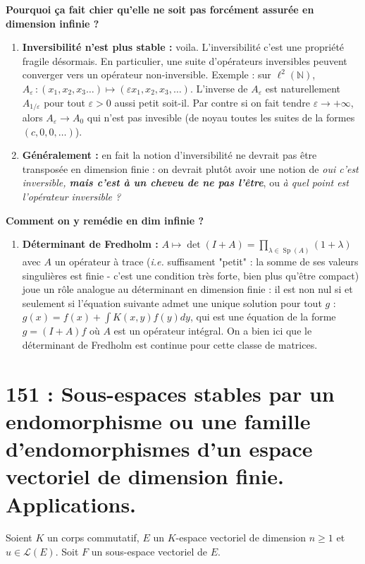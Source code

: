 \documentclass[10pt, a4paper, parskip=full, twoside, twocolumn]{report}
\newcommand{\IN}{\mathbb{N}}
\DeclareMathOperator{\Sp}{Sp}
\begin{document}
\textbf{Pourquoi ça fait chier qu'elle ne soit pas forcément assurée en dimension infinie ?}
\begin{enumerate}
	\item \textbf{Inversibilité n'est plus stable :} voila. L'inversibilité c'est une propriété fragile désormais. En particulier, une suite d'opérateurs inversibles peuvent converger vers un opérateur non-inversible. Exemple : sur $\ell^2(\IN)$, $A_{\varepsilon} \,\colon (x_1,x_2,x_3\dots)\mapsto (\varepsilon x_1, x_2,x_3,\dots)$. L'inverse de $A_{\varepsilon}$ est naturellement $A_{1/\varepsilon}$ pour tout $\varepsilon > 0$ aussi petit soit-il. Par contre si on fait tendre $\varepsilon \longrightarrow +\infty$, alors $A_{\varepsilon}\to A_0$ qui n'est pas invesible (de noyau toutes les suites de la formes $(c,0,0,\dots)$).
	\item \textbf{Généralement :} en fait la notion d'inversibilité ne devrait pas être transposée en dimension finie : on devrait plutôt avoir une notion de \emph{oui c'est inversible, \textbf{mais c'est à un cheveu de ne pas l'être}}, ou \emph{à quel point est l'opérateur inversible ?}
\end{enumerate}

\textbf{Comment on y remédie en dim infinie ?}
\begin{enumerate}
	\item \textbf{Déterminant de Fredholm :} $A\mapsto \det(I+A) = \prod_{\lambda\in \Sp(A)} (1+\lambda)$ avec $A$ un opérateur à trace (\emph{i.e.} suffisament "petit" : la somme de ses valeurs singulières est finie - c'est une condition très forte, bien plus qu'être compact) joue un rôle analogue au déterminant en dimension finie : il est non nul si et seulement si l'équation suivante admet une unique solution pour tout $g$ : $g(x) = f(x) + \int K(x,y)f(y)dy$, qui est une équation de la forme $g = (I+A)f$ où $A$ est un opérateur intégral. On a bien ici que le déterminant de Fredholm est continue pour cette classe de matrices.
\end{enumerate}

\chapter*{151 : Sous-espaces stables par un endomorphisme ou une famille d'endomorphismes d'un espace vectoriel de dimension finie. Applications.}
\setcounter{definition}{0}

\textcolor{paragraphtext}{Soient $K$ un corps commutatif, $E$ un $K$-espace vectoriel de dimension $n\geq 1$ et $u\in\mathcal{L}(E)$. 
Soit $F$ un sous-espace vectoriel de $E$.}
\end{document}
